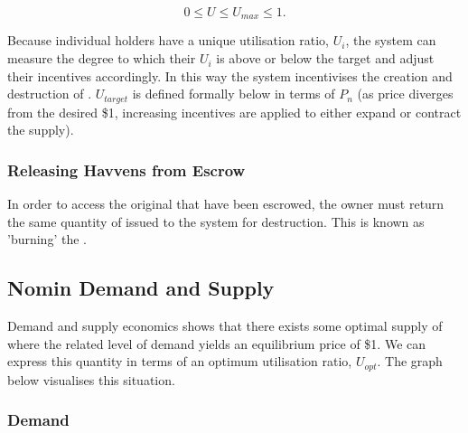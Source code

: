 $$ 0 \leq U \leq U_{max} \leq 1.$$

\noindent Because individual \HAV{} holders have a unique utilisation ratio, $ U_i $, the system can measure the degree to which their $ U_i $ is above or below the target and adjust their incentives accordingly. In this way the system incentivises the creation and destruction of \NOM{}. $ U_{target} $ is defined formally below in terms of $ P_n $ (as \NOM{} price diverges from the desired \$1, increasing incentives are applied to either expand or contract the supply).

\subsubsection{Releasing Havvens from Escrow}

\noindent In order to access the original \HAV{} that have been escrowed, the owner must return the same quantity of issued \NOM{} to the system for destruction. This is known as 'burning' the \NOM{}.

\newpage
\subsection{Nomin Demand and Supply} 

\noindent Demand and supply economics shows that there exists some optimal supply of \NOM{} where the related level of demand yields an equilibrium price of \$1. We can express this quantity in terms of an optimum utilisation ratio, $U_{opt}$. The graph below visualises this situation. \\

	
\subsubsection*{Demand}

